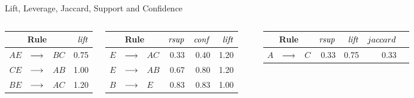 \begin{frame}{Lift, Leverage, Jaccard, Support and Confidence}
  \begin{columns}

\begin{center}
\begin{tabular}{|r>{\centering}m{0.2in}l|r|}
\hline
\multicolumn{3}{|c|}{Rule} & $\mathit{lift}$ \\ \hline
$\mathit{AE}$ & $\arule$ & $\mathit{BC}$ & 0.75 \\ \hline
$\mathit{CE}$ & $\arule$ & $\mathit{AB}$ & 1.00 \\ \hline
$\mathit{BE}$ & $\arule$ & $\mathit{AC}$ & 1.20 \\ \hline
\end{tabular}
\end{center}

\begin{center}
\begin{tabular}{|r>{\centering}m{0.2in}l|r|r|r|}
\hline
\multicolumn{3}{|c|}{Rule} & $\mathit{rsup}$ & $\mathit{conf}$ & $\mathit{lift}$ \\ \hline
$\mathit{E}$ & $\arule$ & $\mathit{AC}$ & 0.33 & 0.40 & 1.20\\ \hline
$\mathit{E}$ & $\arule$ & $\mathit{AB}$ & 0.67 & 0.80 & 1.20\\ \hline
$\mathit{B}$ & $\arule$ & $\mathit{E}$ & 0.83 & 0.83 & 1.00\\ \hline
\end{tabular}
\end{center}
	
\begin{center}
\end{center}
\begin{center}
\begin{tabular}{|r>{\centering}m{0.2in}l|r|r|r|r|}
\hline
\multicolumn{3}{|c|}{Rule} & $\mathit{rsup}$ & $\mathit{lift}$ & $jaccard$\\ \hline
$\mathit{A}$ & $\arule$ & $\mathit{C}$ & 0.33 & 0.75 & 0.33 \\ \hline
\end{tabular}
\end{center}
\end{columns}
\end{frame}




